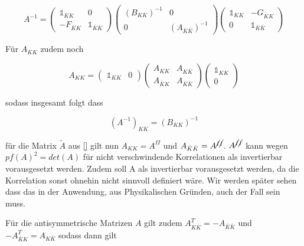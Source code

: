 \begin{equation}
    A^{-1} = 
    \left(\begin{array}{cc} 
        \mathds{1}_{K K}      &  0 \\
        -F_{\bar K K} &  \mathds{1}_{\bar K \bar K}
    \end{array}\right)
    \left(\begin{array}{cc} 
        (B_{K K})^{-1}      &  0 \\
        0 &  (A_{\bar K \bar K})^{-1}
    \end{array}\right)
    \left(\begin{array}{cc} 
        \mathds{1}_{K K}      &  -G_{\bar K K} \\
         0  &  \mathds{1}_{\bar K \bar K}
    \end{array}\right)
\end{equation}

\noindent Für $A_{KK}$ zudem noch

\begin{equation}
    A_{KK} = 
    \left(\begin{array}{cc} 
        \mathds{1}_{K K}      &  0
    \end{array}\right)
    \left(\begin{array}{cc} 
        A_{K K}      &  A_{K \bar K} \\
        A_{\bar K K} &  A_{\bar K \bar K}
    \end{array}\right)
    \left(\begin{array}{c} 
        \mathds{1}_{K K}      \\
        0
    \end{array}\right)
\end{equation}

\noindent sodass insgesamt folgt dass 

\begin{equation}
(A^{-1})_{KK} = (B_{KK})^{-1}
\end{equation}

für die Matrix $\tilde A$ aus \eqref{} gilt nun $A_{KK} = A^{II}$ und $ A_{\bar K \bar K} = A^{\cancel{I} \cancel{I}}$. $A^{\cancel{I} \cancel{I}}$ kann wegen $pf(A)^2 = det(A)$ für nicht verschwindende Korrelationen als invertierbar vorausgesetzt werden. Zudem soll A als invertierbar vorausgesetzt werden, da die Korrelation sonst ohnehin nicht sinnvoll definiert wäre. Wir werden später sehen dass das in der Anwendung, aus Physikalischen Gründen, auch der Fall sein muss. 

Für die antisymmetrische Matrizen $A$ gilt zudem $A_{\bar K \bar K}^T = - A_{\bar K \bar K}$ und $-A_{\bar K K}^T = A_{K \bar K}$ sodass dann gilt

